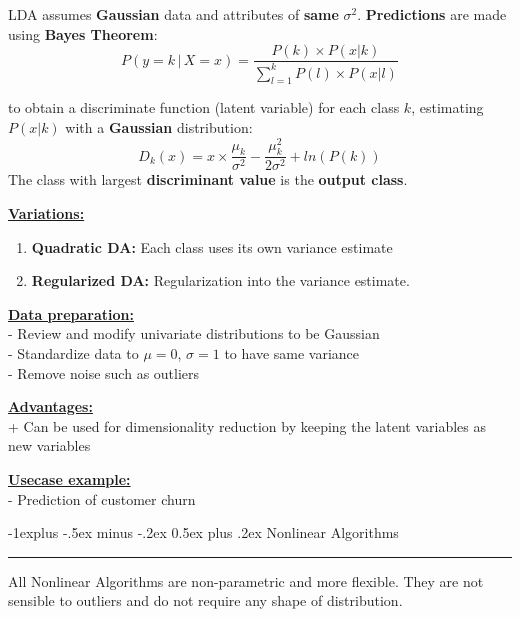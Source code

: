 \documentclass[letterpaper, 10.5pt,landscape]{article}
\makeatletter
\renewcommand{\subsection}{\@startsection{subsection}{2}{0mm}%
                                {-1explus -.5ex minus -.2ex}%
                                {0.5ex plus .2ex}%
                                {\normalfont\normalsize\bfseries}}
\makeatother
\begin{document}
\begin{multicols*}{3}
LDA assumes \textbf{Gaussian} data and attributes of \textbf{same} $\sigma^{2}$. 
\vspace{3pt}
\textbf{Predictions} are made using \textbf{Bayes Theorem}: 
\vspace{-4pt}
\[\boxed{ P(y=k \, | \,  X=x) = \frac{P(k) \times P(x|k)}{\sum^{k}_{l=1} P(l) \times P(x|l) } } \]

to obtain a discriminate function (latent variable) for each class $k$, estimating $P(x|k)$ with a \textbf{Gaussian} distribution:
\vspace{-4pt}
\[\boxed{ D_{k}(x) = x \times \frac{\mu_{k}}{\sigma^{2}} - \frac{\mu_{k}^{2}}{2 \sigma^{2}} + ln(P(k))} \]
The class with largest \textbf{discriminant value} is the \textbf{output class}. 


\vspace{3pt}

\textbf{\underline{Variations:}}
\begin{enumerate}
    \item \textbf{Quadratic DA:} Each class uses its own variance estimate
    \vspace{-2pt}
    \item \textbf{Regularized DA:}  Regularization into the variance estimate.
\end{enumerate}

\vspace{3pt}
\textbf{\underline{Data preparation:}} \\
- Review and modify univariate distributions to be Gaussian \\
- Standardize data to $\mu = 0$,  $\sigma = 1$ to have same variance \\
- Remove noise such as outliers 

\vspace{3pt}
\textbf{\underline{Advantages:}} \\
+ Can be used for dimensionality reduction by keeping the latent variables as new variables

\vspace{3pt}
\textbf{\underline{Usecase example:}} \\
- Prediction of customer churn


\vspace{5pt}



\subsection{Nonlinear Algorithms} {\color{teal}\hrule height 1pt} \smallskip
All Nonlinear Algorithms are non-parametric and more flexible. They are not sensible to outliers and do not require any shape of distribution. 


\end{multicols*}
\end{document}
